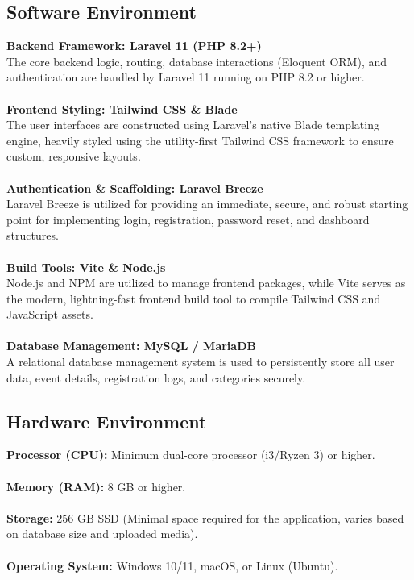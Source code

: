  \subsection{Software Environment}
 \textbf{Backend Framework: Laravel 11 (PHP 8.2+)}\\
 The core backend logic, routing, database interactions (Eloquent ORM), and authentication are handled by Laravel 11 running on PHP 8.2 or higher.\\\\
 \textbf{Frontend Styling: Tailwind CSS \& Blade}\\
 The user interfaces are constructed using Laravel's native Blade templating engine, heavily styled using the utility-first Tailwind CSS framework to ensure custom, responsive layouts.\\\\
 \textbf{Authentication \& Scaffolding: Laravel Breeze}\\
 Laravel Breeze is utilized for providing an immediate, secure, and robust starting point for implementing login, registration, password reset, and dashboard structures.\\\\
 \textbf{Build Tools: Vite \& Node.js}\\
 Node.js and NPM are utilized to manage frontend packages, while Vite serves as the modern, lightning-fast frontend build tool to compile Tailwind CSS and JavaScript assets.\\\\
 \textbf{Database Management: MySQL / MariaDB}\\
 A relational database management system is used to persistently store all user data, event details, registration logs, and categories securely.
 
 \subsection{Hardware Environment}
 \textbf{Processor (CPU):} Minimum dual-core processor (i3/Ryzen 3) or higher.\\\\
 \textbf{Memory (RAM):} 8 GB or higher.\\\\
 \textbf{Storage:} 256 GB SSD (Minimal space required for the application, varies based on database size and uploaded media).\\\\
 \textbf{Operating System:} Windows 10/11, macOS, or Linux (Ubuntu).
 \newpage
 
